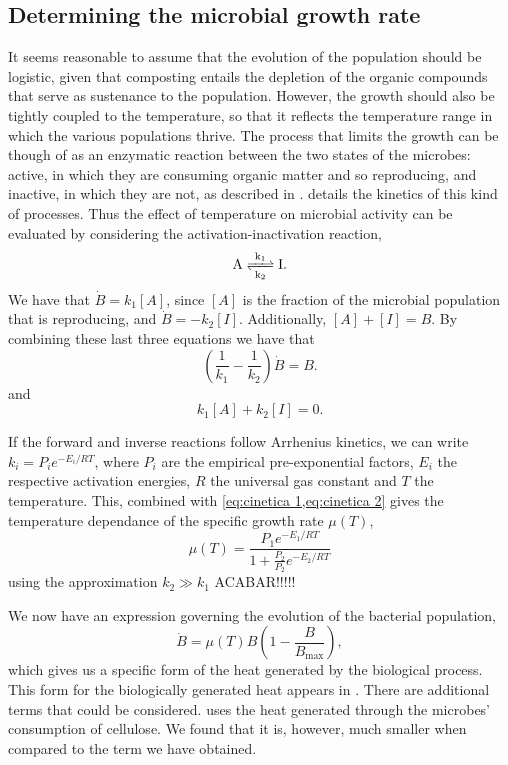 \documentclass[12pt, a4paper, twocolumn, twoside]{article}
\numberwithin{table}{section}
\numberwithin{figure}{section}
\numberwithin{equation}{section}
\begin{document}
\subsection{Determining the microbial growth rate}
It seems reasonable to assume that the evolution of the population should be logistic, given that composting entails the depletion of the organic compounds that serve as sustenance to the population. However, the growth should also be tightly coupled to the temperature, so that it reflects the temperature range in which the various populations thrive. The process that limits the growth can be though of as an enzymatic reaction between the two states of the microbes: active, in which they are consuming organic matter and so reproducing, and inactive, in which they are not, as described in \cite{85bio}. \cite{biokinetics} details the kinetics of this kind of processes. Thus the effect of temperature on microbial activity can be evaluated by considering the activation-inactivation reaction,
\begin{equation*}
    \ce{A <=>[\ce{k1}][\ce{k2}] I}. 
\end{equation*}
We have that $\dot{B}=k_1[A]$, since \( [A] \) is the fraction of the microbial population that is reproducing, and $\dot{B}= -k_2[I]$. Additionally, \( [A] + [I] = B \).  By combining these last three equations we have that
\begin{equation} \label{eq:cinetica 1}
	\left(\frac{1}{k_1}-\frac{1}{k_2}\right)\dot{B}=B.
\end{equation}
and 
\begin{equation} \label{eq:cinetica 2}
	k_1[A]+k_2[I]=0.
\end{equation}

If the forward and inverse reactions follow Arrhenius kinetics, we can write $k_i=P_ie^{-E_i/RT}$, where $P_i$ are the empirical pre-exponential factors, $E_i$ the respective activation energies, $R$ the universal gas constant and $T$ the temperature. This, combined with \cref{eq:cinetica 1,eq:cinetica 2} gives the temperature dependance of the specific growth rate \( \mu(T) \), 
\begin{equation} \label{eq:mumax}
    \mu(T)=\frac{P_1e^{-E_1/RT}}{1+\frac{P_2}{P_2}e^{-E_2/RT}}
\end{equation}
using the approximation $k_2\gg k_1$ ACABAR!!!!!

We now have an expression governing the evolution of the bacterial population,
\begin{equation}\label{eq:edo B}
	\dot{B} = \mu(T)B\left(1 - \frac{B}{B_\text{max}}\right),
\end{equation}
which gives us a specific form of the heat generated by the biological process. This form for the biologically generated heat appears in \cite{semenov}. There are additional terms that could be considered. \cite{semenov} uses the heat generated through the microbes' consumption of cellulose. We found that it is, however, much smaller when compared to the term we have obtained.  
\end{document}
